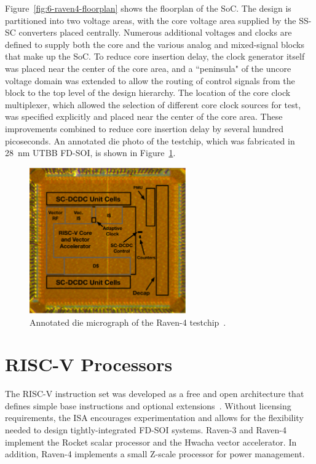 \documentclass[graybox]{svmult}
\begin{document}
Figure~\ref{fig:6-raven4-floorplan} shows the floorplan of the SoC.
The design is partitioned into two voltage areas, with the core voltage area supplied by the SS-SC converters placed centrally.
Numerous additional voltages and clocks are defined to supply both the core and the various analog and mixed-signal blocks that make up the SoC.
To reduce core insertion delay, the clock generator itself was placed near the center of the core area, and a ``peninsula" of the uncore voltage domain was extended to allow the routing of control signals from the block to the top level of the design hierarchy.
The location of the core clock multiplexer, which allowed the selection of different core clock sources for test, was specified explicitly and placed near the center of the core area.
These improvements combined to reduce core insertion delay by several hundred picoseconds.
An annotated die photo of the testchip, which was fabricated in \SI{28}{\nano\meter} UTBB FD-SOI, is shown in Figure~\ref{fig:6-raven4-diephoto}.

\begin{figure}
  \centering
  \includegraphics[width=0.6\textwidth]{6-raven4-diephoto}
  \caption{Annotated die micrograph of the Raven-4 testchip~\cite{Keller2016}.}
  \label{fig:6-raven4-diephoto}
\end{figure}



\section{RISC-V Processors}

The RISC-V instruction set was developed as a free and open architecture that defines simple base instructions and optional extensions~\cite{RISCV}.
Without licensing requirements, the ISA encourages experimentation and allows for the flexibility needed to design tightly-integrated FD-SOI systems.
Raven-3 and Raven-4 implement the Rocket scalar processor and the Hwacha vector accelerator.
In addition, Raven-4 implements a small Z-scale processor for power management.
\end{document}
